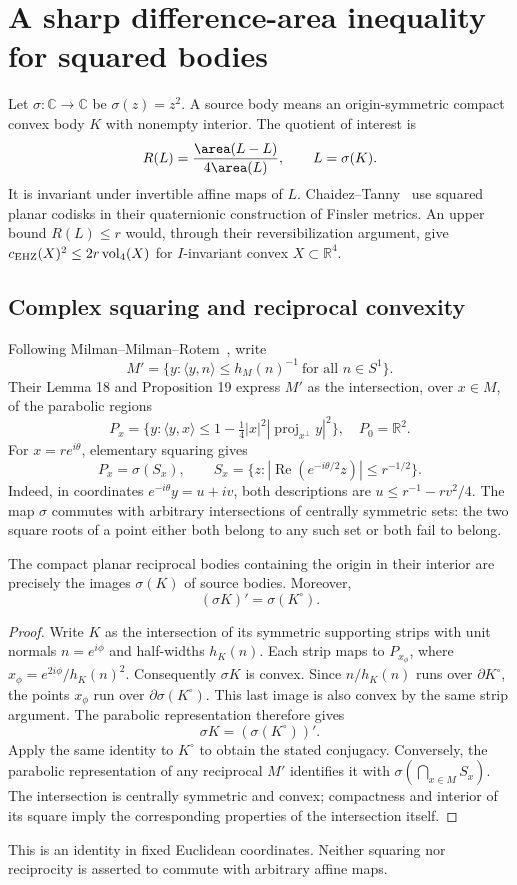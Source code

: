 \section{A sharp difference-area inequality for squared bodies}
\label{sec:squared}
Let $\sigma:\mathbb C\to\mathbb C$ be $\sigma(z)=z^2$. A source body means an origin-symmetric compact convex body $K$ with nonempty interior. The quotient of interest is
\[
 R(L)=\frac{\area(L-L)}{4\area(L)},\qquad L=\sigma(K).
\]
It is invariant under invertible affine maps of $L$. Chaidez--Tanny~\cite{CT2026} use squared planar codisks in their quaternionic construction of Finsler metrics. An upper bound $R(L)\leq r$ would, through their reversibilization argument, give $c_{\rm EHZ}(X)^2\leq2r\operatorname{vol}_4(X)$ for $I$-invariant convex $X\subset\mathbb R^4$.

\subsection{Complex squaring and reciprocal convexity}
Following Milman--Milman--Rotem~\cite{MMR2018}, write
\[
 M'=\{y:\langle y,n\rangle\leq h_M(n)^{-1}\ \text{for all }n\in S^1\}.
\]
Their Lemma 18 and Proposition 19 express $M'$ as the intersection, over $x\in M$, of the parabolic regions
\[
 P_x=\{y:\langle y,x\rangle\leq 1-\tfrac14|x|^2|\operatorname{proj}_{x^\perp}y|^2\},\quad P_0=\mathbb R^2.
\]
For $x=re^{i\theta}$, elementary squaring gives
\[
 P_x=\sigma(S_x),\qquad S_x=\{z:|\operatorname{Re}(e^{-i\theta/2}z)|\leq r^{-1/2}\}.
\]
Indeed, in coordinates $e^{-i\theta}y=u+iv$, both descriptions are $u\leq r^{-1}-rv^2/4$. The map $\sigma$ commutes with arbitrary intersections of centrally symmetric sets: the two square roots of a point either both belong to any such set or both fail to belong.

\begin{theorem}
The compact planar reciprocal bodies containing the origin in their interior are precisely the images $\sigma(K)$ of source bodies. Moreover,
\[
 (\sigma K)'=\sigma(K^\circ).
\]
\end{theorem}
\begin{proof}
Write $K$ as the intersection of its symmetric supporting strips with unit normals $n=e^{i\phi}$ and half-widths $h_K(n)$. Each strip maps to $P_{x_\phi}$, where $x_\phi=e^{2i\phi}/h_K(n)^2$. Consequently $\sigma K$ is convex. Since $n/h_K(n)$ runs over $\partial K^\circ$, the points $x_\phi$ run over $\partial\sigma(K^\circ)$. This last image is also convex by the same strip argument. The parabolic representation therefore gives
\[
 \sigma K=(\sigma(K^\circ))'.
\]
Apply the same identity to $K^\circ$ to obtain the stated conjugacy. Conversely, the parabolic representation of any reciprocal $M'$ identifies it with $\sigma(\bigcap_{x\in M}S_x)$. The intersection is centrally symmetric and convex; compactness and interior of its square imply the corresponding properties of the intersection itself.
\end{proof}
This is an identity in fixed Euclidean coordinates. Neither squaring nor reciprocity is asserted to commute with arbitrary affine maps.

